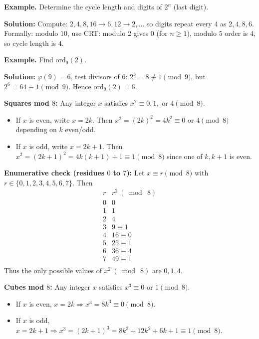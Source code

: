 \documentclass[12pt]{extarticle}
\begin{document}
\begin{examplebox}
	\textbf{Example.} Determine the cycle length and digits of $2^n$ (last digit).
\end{examplebox}

	\textbf{Solution:}
Compute: $2,4,8,16\to 6, 12\to 2, \ldots$ so digits repeat every $4$ as $\boxed{2,4,8,6}$.
Formally: modulo $10$, use CRT: modulo $2$ gives $0$ (for $n\ge1$), modulo $5$ order is $4$, so cycle length is $4$.

\begin{examplebox}
	\textbf{Example.} Find $\text{ord}_{9}(2)$.
\end{examplebox}

	\textbf{Solution:} $\varphi(9)=6$, test divisors of $6$: $2^3=8\not\equiv1\pmod9$, but $2^6=64\equiv1\pmod9$. Hence $\text{ord}_{9}(2)=\boxed{6}$.

\begin{conceptbox}
	\textbf{Squares mod $8$:} Any integer $x$ satisfies $x^2\equiv 0,1,\text{ or }4\pmod8$.
\begin{itemize}
\item If $x$ is even, write $x=2k$. Then $x^2=(2k)^2=4k^2\equiv 0 \text{ or }4\pmod8$ depending on $k$ even/odd.
\item If $x$ is odd, write $x=2k+1$. Then $x^2=(2k+1)^2=4k(k+1)+1\equiv 1\pmod8$ since one of $k,k+1$ is even.
\end{itemize}

\textbf{Enumerative check (residues $0$ to $7$):}
Let $x\equiv r\pmod8$ with $r\in\{0,1,2,3,4,5,6,7\}$. Then
\[
\begin{array}{c|c}
r & r^2\ (\bmod\ 8) \\ \hline
0 & 0 \\
1 & 1 \\
2 & 4 \\
3 & 9\equiv 1 \\
4 & 16\equiv 0 \\
5 & 25\equiv 1 \\
6 & 36\equiv 4 \\
7 & 49\equiv 1 \\
\end{array}
\]
Thus the only possible values of $x^2\ (\bmod\ 8)$ are $\boxed{0,1,4}$.

	\textbf{Cubes mod $8$:} Any integer $x$ satisfies $x^3\equiv 0 \text{ or }1\pmod8$.
\begin{itemize}
\item If $x$ is even, $x=2k \Rightarrow x^3=8k^3\equiv 0\pmod8$.
\item If $x$ is odd, $x=2k+1 \Rightarrow x^3=(2k+1)^3=8k^3+12k^2+6k+1\equiv 1\pmod8$.
\end{itemize}
\end{conceptbox}
\end{document}
